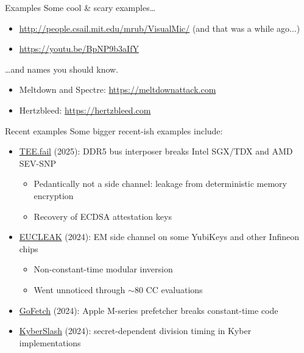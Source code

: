 \begin{frame}{Examples}
  Some cool \& scary examples\dots
  \begin{itemize}[<+(1)->]
    \item {\small\url{http://people.csail.mit.edu/mrub/VisualMic/}} (and that was a while ago...)
    \item {\small\url{https://youtu.be/BpNP9b3aIfY}}
  \end{itemize}

  \vspace*{1em}

  \pause
  \dots{}and names you should know.
  \begin{itemize}[<+(1)->]
    \item Meltdown and Spectre: {\small\url{https://meltdownattack.com}}
    \item Hertzbleed: {\small\url{https://hertzbleed.com}}
  \end{itemize}
\end{frame}

\begin{frame}{Recent examples}
  Some bigger recent-ish examples include:
  \begin{itemize}[<+(1)->]
    \item \href{https://tee.fail}{TEE.fail} (2025): DDR5 bus interposer breaks Intel SGX/TDX and AMD SEV-SNP
    \par
    \begin{itemize}
      \item Pedantically not a side channel: leakage from deterministic memory encryption
      \item Recovery of ECDSA attestation keys
    \end{itemize}
    \item \href{https://ninjalab.io/eucleak/}{EUCLEAK} (2024): EM side channel on some YubiKeys and other Infineon chips
    \par
    \begin{itemize}
      \item Non-constant-time modular inversion
      \item Went unnoticed through $\sim$80 CC evaluations
    \end{itemize}
    \item \href{https://gofetch.fail}{GoFetch} (2024): Apple M-series prefetcher breaks constant-time code
    \item \href{https://kyberslash.cr.yp.to}{KyberSlash} (2024): secret-dependent division timing in Kyber implementations
  \end{itemize}
\end{frame}

